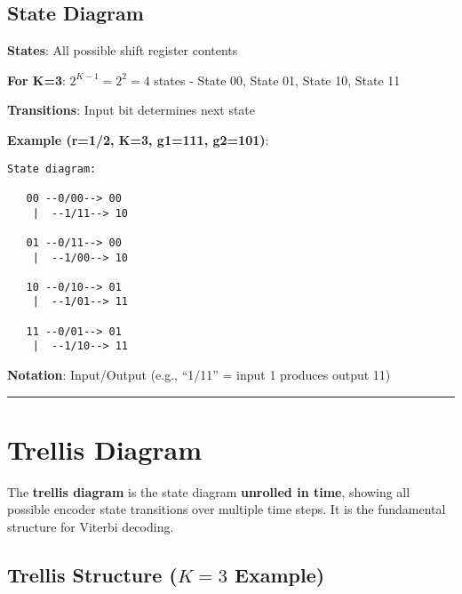 \subsection{State Diagram}\label{state-diagram}

\textbf{States}: All possible shift register contents

\textbf{For K=3}: \(2^{K-1} = 2^2 = 4\) states - State 00, State 01,
State 10, State 11

\textbf{Transitions}: Input bit determines next state

\textbf{Example (r=1/2, K=3, g1=111, g2=101)}:

\begin{verbatim}
State diagram:

   00 --0/00--> 00
    |  --1/11--> 10
    
   01 --0/11--> 00
    |  --1/00--> 10
    
   10 --0/10--> 01
    |  --1/01--> 11
    
   11 --0/01--> 01
    |  --1/10--> 11
\end{verbatim}

\textbf{Notation}: Input/Output (e.g., ``1/11'' = input 1 produces
output 11)

\begin{center}\rule{0.5\linewidth}{0.5pt}\end{center}

\section{Trellis Diagram}

The \textbf{trellis diagram} is the state diagram \textbf{unrolled in time}, showing all possible encoder state transitions over multiple time steps. It is the fundamental structure for Viterbi decoding.

\subsection{Trellis Structure ($K=3$ Example)}

